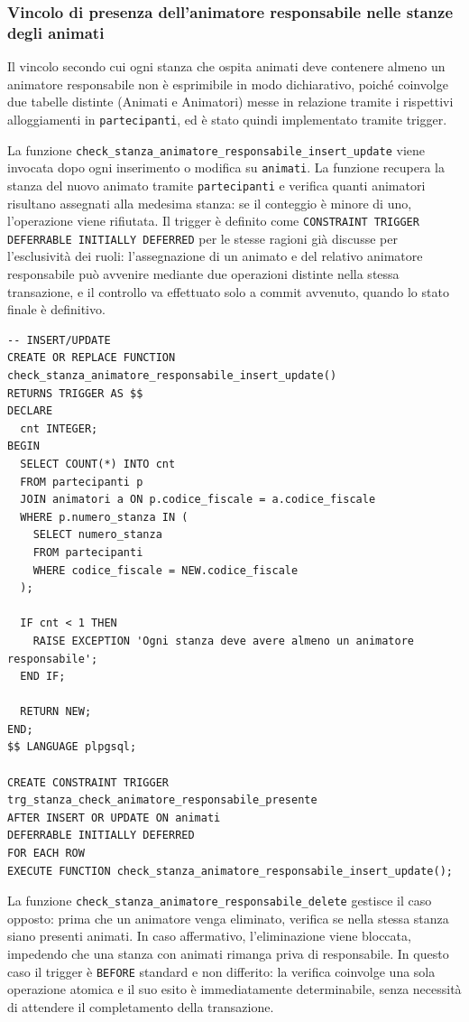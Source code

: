 \documentclass[11pt,a4paper]{article}
\begin{document}
\subsubsection{Vincolo di presenza dell'animatore responsabile nelle stanze degli animati}

Il vincolo secondo cui ogni stanza che ospita animati deve contenere almeno un animatore
responsabile non è esprimibile in modo dichiarativo, poiché coinvolge due tabelle distinte
(Animati e Animatori) messe in relazione tramite i rispettivi alloggiamenti in
\texttt{partecipanti}, ed è stato quindi implementato tramite trigger.

La funzione \texttt{check\_stanza\_animatore\_responsabile\_insert\_update} viene invocata dopo
ogni inserimento o modifica su \texttt{animati}. La funzione recupera la stanza del nuovo
animato tramite \texttt{partecipanti} e verifica quanti animatori risultano assegnati alla
medesima stanza: se il conteggio è minore di uno, l'operazione viene rifiutata. Il trigger è
definito come \texttt{CONSTRAINT TRIGGER DEFERRABLE INITIALLY DEFERRED} per le stesse ragioni
già discusse per l'esclusività dei ruoli: l'assegnazione di un animato e del relativo animatore
responsabile può avvenire mediante due operazioni distinte nella stessa transazione, e il
controllo va effettuato solo a commit avvenuto, quando lo stato finale è definitivo.

\begin{verbatim}
-- INSERT/UPDATE
CREATE OR REPLACE FUNCTION check_stanza_animatore_responsabile_insert_update()
RETURNS TRIGGER AS $$
DECLARE
  cnt INTEGER;
BEGIN
  SELECT COUNT(*) INTO cnt
  FROM partecipanti p
  JOIN animatori a ON p.codice_fiscale = a.codice_fiscale
  WHERE p.numero_stanza IN (
    SELECT numero_stanza
    FROM partecipanti
    WHERE codice_fiscale = NEW.codice_fiscale
  );

  IF cnt < 1 THEN
    RAISE EXCEPTION 'Ogni stanza deve avere almeno un animatore responsabile';
  END IF;

  RETURN NEW;
END;
$$ LANGUAGE plpgsql;

CREATE CONSTRAINT TRIGGER trg_stanza_check_animatore_responsabile_presente
AFTER INSERT OR UPDATE ON animati
DEFERRABLE INITIALLY DEFERRED
FOR EACH ROW
EXECUTE FUNCTION check_stanza_animatore_responsabile_insert_update();
\end{verbatim}

La funzione \texttt{check\_stanza\_animatore\_responsabile\_delete} gestisce il caso opposto:
prima che un animatore venga eliminato, verifica se nella stessa stanza siano presenti animati.
In caso affermativo, l'eliminazione viene bloccata, impedendo che una stanza con animati
rimanga priva di responsabile. In questo caso il trigger è \texttt{BEFORE} standard e non
differito: la verifica coinvolge una sola operazione atomica e il suo esito è immediatamente
determinabile, senza necessità di attendere il completamento della transazione.
\end{document}
